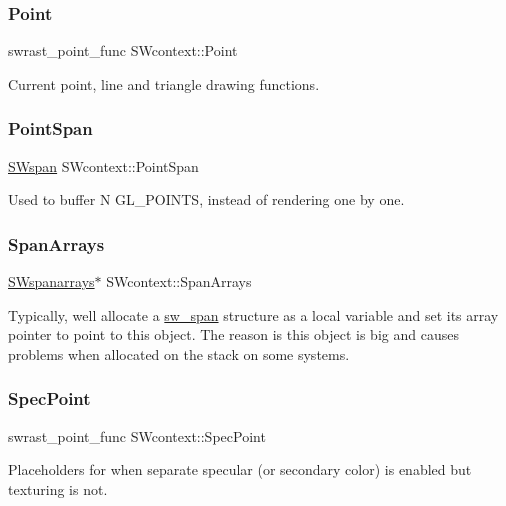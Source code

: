 \subsubsection{\texorpdfstring{Point}{Point}}
{\footnotesize\ttfamily swrast\+\_\+point\+\_\+func S\+Wcontext\+::\+Point}

Current point, line and triangle drawing functions. \mbox{\label{struct_s_wcontext_a48d01783b4f7429df1a061ff2a0e93a8}} 
\subsubsection{\texorpdfstring{Point\+Span}{PointSpan}}
{\footnotesize\ttfamily \hyperlink{structsw__span}{S\+Wspan} S\+Wcontext\+::\+Point\+Span}

Used to buffer N G\+L\+\_\+\+P\+O\+I\+N\+TS, instead of rendering one by one. \mbox{\label{struct_s_wcontext_af008f2ef3faa86a7f22b5821708f0367}} 
\subsubsection{\texorpdfstring{Span\+Arrays}{SpanArrays}}
{\footnotesize\ttfamily \hyperlink{structsw__span__arrays}{S\+Wspanarrays}$\ast$ S\+Wcontext\+::\+Span\+Arrays}

Typically, we\textquotesingle{}ll allocate a \hyperlink{structsw__span}{sw\+\_\+span} structure as a local variable and set its \textquotesingle{}array\textquotesingle{} pointer to point to this object. The reason is this object is big and causes problems when allocated on the stack on some systems. \mbox{\label{struct_s_wcontext_a47145fa59832830e48e42a33f8a08a69}} 
\subsubsection{\texorpdfstring{Spec\+Point}{SpecPoint}}
{\footnotesize\ttfamily swrast\+\_\+point\+\_\+func S\+Wcontext\+::\+Spec\+Point}

Placeholders for when separate specular (or secondary color) is enabled but texturing is not. \mbox{\label{struct_s_wcontext_a8318f169b67f742b63fc3cd23f977f1c}} 
